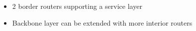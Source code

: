 \begin{itemize}
    \item 2 border routers supporting a service layer
    \item Backbone layer can be extended with more interior routers
\end{itemize}
